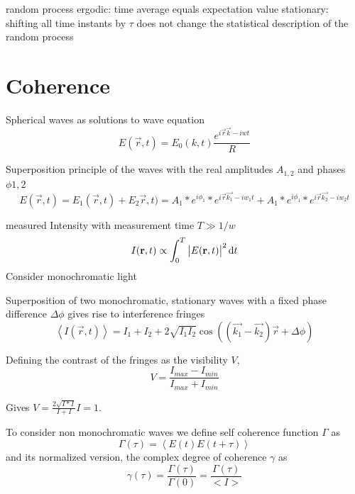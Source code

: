 random process
ergodic: time average equals expectation value
stationary: shifting all time instants by $\tau$ does not change the statistical description of the random process 

\section{Coherence}
Spherical waves as  solutions to wave equation
\begin{equation}
	E(\vec{r},t)=E_0(k,t) \frac{e^{i\vec{r}\vec{k}-iwt}}{R}
	\end{equation}

Superposition principle of the waves with the real amplitudes $A_{1,2}$ and phases $\phi{1,2}$
\begin{equation}
E(\vec{r},t)=E_1(\vec{r},t)+E_2\vec{r},t)=A_1*e^{i\phi_1} * e^{i\vec{r}\vec{k_1}-iw_1t} + A_1*e^{i\phi_1} * e^{i\vec{r}\vec{k_2}-iw_2t} 
\end{equation} 





measured Intensity with measurement time $T\gg1/w$
\begin{equation}
	I(\mathbf{r},t)\propto \int_0^T \left|E(\mathbf{r},t)\right|^2 \operatorname{\mathrm{d}\!} t
\end{equation}
Consider monochromatic light

Superposition of two monochromatic, stationary waves with a fixed phase difference $\Delta \phi$ gives rise to interference fringes
\begin{equation}
	\left<I(\vec{r},t)\right>=I_1+I_2+2\sqrt{I_1I_2}\cos\left((\vec{k_1}-\vec{k_2})\vec{r}+\Delta \phi\right)
\end{equation}

Defining the contrast of the fringes as the visibility $V$,
\begin{equation}
	V=\frac{I_{max}-I_{min}}{I_{max}+I_{min}}
\end{equation} 

Gives $V=\frac{2\sqrt{I*I}}{I+I}I=1$.

To consider non monochromatic waves we define self coherence function $\Gamma$ as 
\begin{equation}
\Gamma(\tau)=\left< E(t)E(t+\tau)\right>
\end{equation}
and its normalized version, the complex degree of coherence $\gamma$ as
\begin{equation}
\gamma(\tau)=\frac{\Gamma(\tau)}{\Gamma(0)} =  \frac{\Gamma(\tau)}{<I>}
\end{equation}



